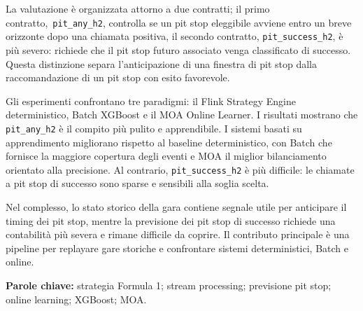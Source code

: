 \documentclass{Configuration_Files/PoliMi3i_thesis}
\begin{document}
La valutazione è organizzata attorno a due contratti; il primo contratto,\ \texttt{pit\_any\_h2}, controlla se un pit stop eleggibile
avviene entro un breve orizzonte dopo una chiamata positiva, il secondo contratto, \texttt{pit\_success\_h2}, è più severo: richiede che il pit stop futuro associato
venga classificato di successo. Questa distinzione separa l'anticipazione di una finestra di pit stop dalla raccomandazione di un pit stop con esito favorevole.

Gli esperimenti confrontano tre paradigmi: il Flink Strategy Engine deterministico, Batch XGBoost e il MOA Online Learner. I risultati mostrano che
\texttt{pit\_any\_h2} è il compito più pulito e apprendibile. I sistemi basati su apprendimento migliorano rispetto al baseline deterministico, con Batch
che fornisce la maggiore copertura degli eventi e MOA il miglior bilanciamento orientato alla precisione. Al contrario, \texttt{pit\_success\_h2} è più difficile:
le chiamate a pit stop di successo sono sparse e sensibili alla soglia scelta.

Nel complesso, lo stato storico della gara contiene segnale utile per anticipare il timing dei pit stop, mentre la previsione dei pit stop di successo
richiede una contabilità più severa e rimane difficile da coprire. Il contributo principale è una pipeline per replayare gare storiche
e confrontare sistemi deterministici, Batch e online.

\vspace{1em}
\textbf{Parole chiave:} strategia Formula 1; stream processing; previsione pit stop; online learning; XGBoost; MOA.






\thispagestyle{empty}
\tableofcontents %
\thispagestyle{empty}
\cleardoublepage

%
%
%    
%
\end{document}

